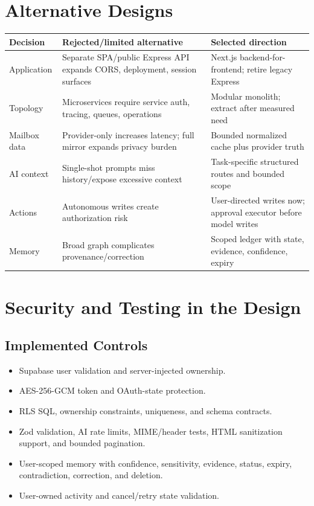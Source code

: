 \documentclass[11pt]{article}
\begin{document}
\section{Alternative Designs}

\begin{longtable}{@{}p{}p{}p{}@{}}
\toprule
Decision & Rejected/limited alternative & Selected direction \\
\midrule
\endhead
\bottomrule
\endlastfoot
Application & Separate SPA/public Express API expands CORS, deployment, session surfaces & Next.js backend-for-frontend; retire legacy Express \\
Topology & Microservices require service auth, tracing, queues, operations & Modular monolith; extract after measured need \\
Mailbox data & Provider-only increases latency; full mirror expands privacy burden & Bounded normalized cache plus provider truth \\
AI context & Single-shot prompts miss history/expose excessive context & Task-specific structured routes and bounded scope \\
Actions & Autonomous writes create authorization risk & User-directed writes now; approval executor before model writes \\
Memory & Broad graph complicates provenance/correction & Scoped ledger with state, evidence, confidence, expiry \\
\end{longtable}

\section{Security and Testing in the Design}

\subsection{Implemented Controls}
\begin{itemize}
  \item Supabase user validation and server-injected ownership.
  \item AES-256-GCM token and OAuth-state protection.
  \item RLS SQL, ownership constraints, uniqueness, and schema contracts.
  \item Zod validation, AI rate limits, MIME/header tests, HTML sanitization
        support, and bounded pagination.
  \item User-scoped memory with confidence, sensitivity, evidence, status,
        expiry, contradiction, correction, and deletion.
  \item User-owned activity and cancel/retry state validation.
\end{itemize}
\end{document}
